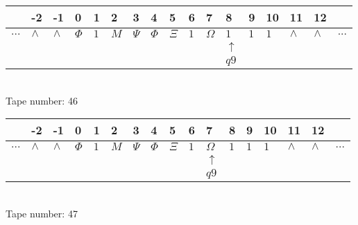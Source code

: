 \documentclass{article}
\begin{document}
\begin{table}[H]
\centering
\begin{tabular}{lllllllllllllllll}
 & -2 & -1 & 0 & 1 & 2 & 3 & 4 & 5 & 6 & 7 & 8 & 9 & 10 & 11 & 12 & \\
\hline
$...$ & \multicolumn{1}{|l|}{$\wedge$} & \multicolumn{1}{|l|}{$\wedge$} & \multicolumn{1}{|l|}{$\Phi$} & \multicolumn{1}{|l|}{$1$} & \multicolumn{1}{|l|}{$M$} & \multicolumn{1}{|l|}{$\Psi$} & \multicolumn{1}{|l|}{$\Phi$} & \multicolumn{1}{|l|}{$\Xi$} & \multicolumn{1}{|l|}{$1$} & \multicolumn{1}{|l|}{$\Omega$} & \multicolumn{1}{|l|}{$1$} & \multicolumn{1}{|l|}{$1$} & \multicolumn{1}{|l|}{$1$} & \multicolumn{1}{|l|}{$\wedge$} & \multicolumn{1}{|l|}{$\wedge$} & $...$\\
\hline
&  &  &  &  &  &  &  &  &  &  & $\uparrow$ &  &  &  &  &  \\
&  &  &  &  &  &  &  &  &  &  & $ q9 $ &  &  &  &  &  \\
\end{tabular}
\\
Tape number: 46
\noindent\makebox[\linewidth]{\hdashrule{\textwidth}{1pt}{1pt}}\end{table}

\begin{table}[H]
\centering
\begin{tabular}{lllllllllllllllll}
 & -2 & -1 & 0 & 1 & 2 & 3 & 4 & 5 & 6 & 7 & 8 & 9 & 10 & 11 & 12 & \\
\hline
$...$ & \multicolumn{1}{|l|}{$\wedge$} & \multicolumn{1}{|l|}{$\wedge$} & \multicolumn{1}{|l|}{$\Phi$} & \multicolumn{1}{|l|}{$1$} & \multicolumn{1}{|l|}{$M$} & \multicolumn{1}{|l|}{$\Psi$} & \multicolumn{1}{|l|}{$\Phi$} & \multicolumn{1}{|l|}{$\Xi$} & \multicolumn{1}{|l|}{$1$} & \multicolumn{1}{|l|}{$\Omega$} & \multicolumn{1}{|l|}{$1$} & \multicolumn{1}{|l|}{$1$} & \multicolumn{1}{|l|}{$1$} & \multicolumn{1}{|l|}{$\wedge$} & \multicolumn{1}{|l|}{$\wedge$} & $...$\\
\hline
&  &  &  &  &  &  &  &  &  & $\uparrow$ &  &  &  &  &  &  \\
&  &  &  &  &  &  &  &  &  & $ q9 $ &  &  &  &  &  &  \\
\end{tabular}
\\
Tape number: 47
\noindent\makebox[\linewidth]{\hdashrule{\textwidth}{1pt}{1pt}}\end{table}
\clearpage
\end{document}

